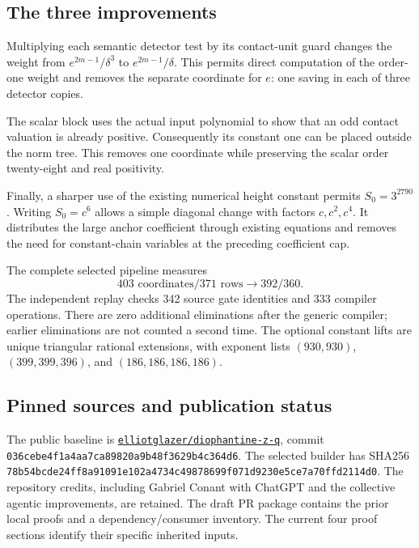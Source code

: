 \documentclass[11pt]{article}
\begin{document}
\subsection{The three improvements}

Multiplying each semantic detector test by its contact-unit guard changes
the weight from $e^{2m-1}/\delta^3$ to $e^{2m-1}/\delta$. This permits
direct computation of the order-one weight and removes the separate
coordinate for $e$: one saving in each of three detector copies.

The scalar block uses the actual input polynomial to show that an odd
contact valuation is already positive. Consequently its constant one
can be placed outside the norm tree. This removes one coordinate while
preserving the scalar order twenty-eight and real positivity.

Finally, a sharper use of the existing numerical height constant permits
$S_0=3^{2790}$. Writing $S_0=c^6$ allows a simple diagonal change with
factors $c,c^2,c^4$. It distributes the large anchor coefficient through
existing equations and removes the need for constant-chain variables
at the preceding coefficient cap.

The complete selected pipeline measures
\[
 403\text{ coordinates}/371\text{ rows}
 \longrightarrow392/360.
\]
The independent replay checks 342 source gate identities and 333
compiler operations. There are zero additional eliminations after the
generic compiler; earlier eliminations are not counted a second time.
The optional constant lifts are unique triangular rational extensions,
with exponent lists $(930,930)$, $(399,399,396)$, and $(186,186,186,186)$.

\subsection{Pinned sources and publication status}

The public baseline is
\href{https://github.com/elliotglazer/diophantine-z-q/tree/036cebe4f1a4aa7ca89820a9b48f3629b4c364d6}{\texttt{elliotglazer/diophantine-z-q}},
commit\\
{\small\texttt{036cebe4f1a4aa7ca89820a9b48f3629b4c364d6}}.
The selected builder has SHA256\\
{\small\texttt{78b54bcde24ff8a91091e102a4734c49878699f071d9230e5ce7a70ffd2114d0}}.
The repository credits, including Gabriel Conant with ChatGPT and the
collective agentic improvements, are retained. The draft PR package
contains the prior local proofs and a dependency/consumer inventory.
The current four proof sections identify their specific inherited inputs.
\end{document}
